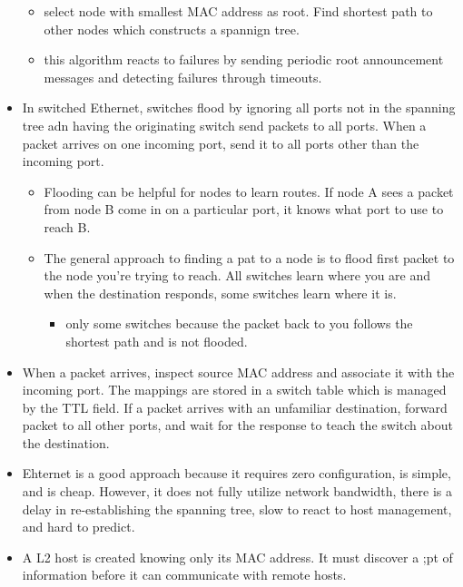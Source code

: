 \documentclass[]{article}
\providecommand{\tightlist}{%
  \setlength{\itemsep}{0pt}\setlength{\parskip}{0pt}}
\begin{document}
\begin{itemize}
  \begin{itemize}
  \tightlist
  \item
    select node with smallest MAC address as root. Find shortest path to
    other nodes which constructs a spannign tree.
  \item
    this algorithm reacts to failures by sending periodic root
    announcement messages and detecting failures through timeouts.
  \end{itemize}
\item
  In switched Ethernet, switches flood by ignoring all ports not in the
  spanning tree adn having the originating switch send packets to all
  ports. When a packet arrives on one incoming port, send it to all
  ports other than the incoming port.

  \begin{itemize}
  \tightlist
  \item
    Flooding can be helpful for nodes to learn routes. If node A sees a
    packet from node B come in on a particular port, it knows what port
    to use to reach B.
  \item
    The general approach to finding a pat to a node is to flood first
    packet to the node you're trying to reach. All switches learn where
    you are and when the destination responds, some switches learn where
    it is.

    \begin{itemize}
    \tightlist
    \item
      only some switches because the packet back to you follows the
      shortest path and is not flooded.
    \end{itemize}
  \end{itemize}
\item
  When a packet arrives, inspect source MAC address and associate it
  with the incoming port. The mappings are stored in a switch table
  which is managed by the TTL field. If a packet arrives with an
  unfamiliar destination, forward packet to all other ports, and wait
  for the response to teach the switch about the destination.
\item
  Ehternet is a good approach because it requires zero configuration, is
  simple, and is cheap. However, it does not fully utilize network
  bandwidth, there is a delay in re-establishing the spanning tree, slow
  to react to host management, and hard to predict.
\item
  A L2 host is created knowing only its MAC address. It must discover a
  ;pt of information before it can communicate with remote hosts.


\end{itemize}
\end{document}
